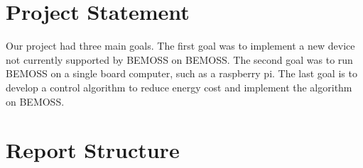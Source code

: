 \section{Project Statement}
Our project had three main goals. The first goal was to implement a new device not currently supported by BEMOSS on BEMOSS. The second goal was to run BEMOSS on a single board computer, such as a raspberry pi. The last goal is to develop a control algorithm to reduce energy cost and implement the algorithm on BEMOSS.

\section{Report Structure}

